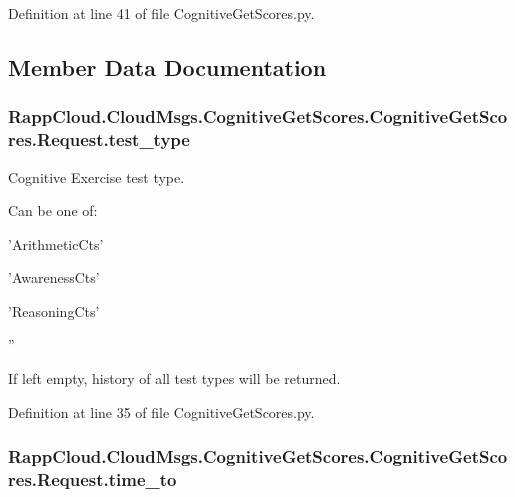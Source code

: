 Definition at line 41 of file Cognitive\-Get\-Scores.\-py.



\subsection{Member Data Documentation}
\hypertarget{classRappCloud_1_1CloudMsgs_1_1CognitiveGetScores_1_1CognitiveGetScores_1_1Request_a86df12bf13716a047579bc0796ca19bc}{
\subsubsection[{test\-\_\-type}]{\setlength{\rightskip}{0pt plus 5cm}Rapp\-Cloud.\-Cloud\-Msgs.\-Cognitive\-Get\-Scores.\-Cognitive\-Get\-Scores.\-Request.\-test\-\_\-type}}\label{classRappCloud_1_1CloudMsgs_1_1CognitiveGetScores_1_1CognitiveGetScores_1_1Request_a86df12bf13716a047579bc0796ca19bc}


Cognitive Exercise test type. 

Can be one of\-:
\begin{DoxyItemize}
\item 'Arithmetic\-Cts'
\item 'Awareness\-Cts'
\item 'Reasoning\-Cts'
\item ''
\end{DoxyItemize}

If left empty, history of all test types will be returned. 

Definition at line 35 of file Cognitive\-Get\-Scores.\-py.

\hypertarget{classRappCloud_1_1CloudMsgs_1_1CognitiveGetScores_1_1CognitiveGetScores_1_1Request_a6636727d19775b0d8886fb2cd92b72aa}{
\subsubsection[{time\-\_\-to}]{\setlength{\rightskip}{0pt plus 5cm}Rapp\-Cloud.\-Cloud\-Msgs.\-Cognitive\-Get\-Scores.\-Cognitive\-Get\-Scores.\-Request.\-time\-\_\-to}}\label{classRappCloud_1_1CloudMsgs_1_1CognitiveGetScores_1_1CognitiveGetScores_1_1Request_a6636727d19775b0d8886fb2cd92b72aa}


